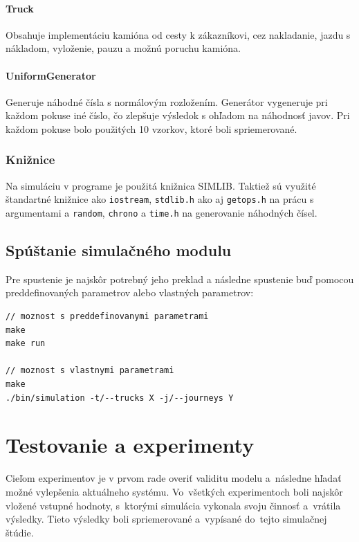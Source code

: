 \documentclass[a4paper, 11pt]{article}
\begin{document}
    \paragraph{Truck}
    Obsahuje implementáciu kamióna od cesty k zákazníkovi, cez nakladanie, jazdu s nákladom,
    vyloženie, pauzu a možnú poruchu kamióna.

    \paragraph{UniformGenerator}
    Generuje náhodné čísla s normálovým rozložením. Generátor vygeneruje
    pri každom pokuse iné číslo, čo zlepšuje výsledok s ohľadom na náhodnosť
    javov. Pri každom pokuse bolo použitých 10 vzorkov, ktoré boli spriemerované.

    \subsubsection{Knižnice}
    Na simuláciu v programe je použitá knižnica SIMLIB\cite{SIMLIB}.\newline
    Taktiež sú využité štandartné knižnice ako \texttt{iostream},
    \texttt{stdlib.h} ako aj \texttt{getops.h} na prácu s argumentami a
    \texttt{random}, \texttt{chrono} a \texttt{time.h} na generovanie
    náhodných čísel.

    \subsection{Spúštanie simulačného modulu}
    Pre spustenie je najskôr potrebný jeho preklad a následne spustenie buď
    pomocou preddefinovaných parametrov alebo vlastných parametrov:
\begin{lstlisting}
// moznost s preddefinovanymi parametrami
make
make run
    
// moznost s vlastnymi parametrami
make
./bin/simulation -t/--trucks X -j/--journeys Y
\end{lstlisting}   

    \newpage
	\section{Testovanie a experimenty}
	Cieľom experimentov je v prvom rade overiť validitu modelu a~následne
    hľadať možné vylepšenia aktuálneho systému.
    Vo~všetkých experimentoch boli najskôr vložené vstupné hodnoty, 
    s~ktorými simulácia vykonala svoju činnosť a~vrátila výsledky. Tieto
    výsledky boli spriemerované a~vypísané do~tejto simulačnej štúdie.
\end{document}

